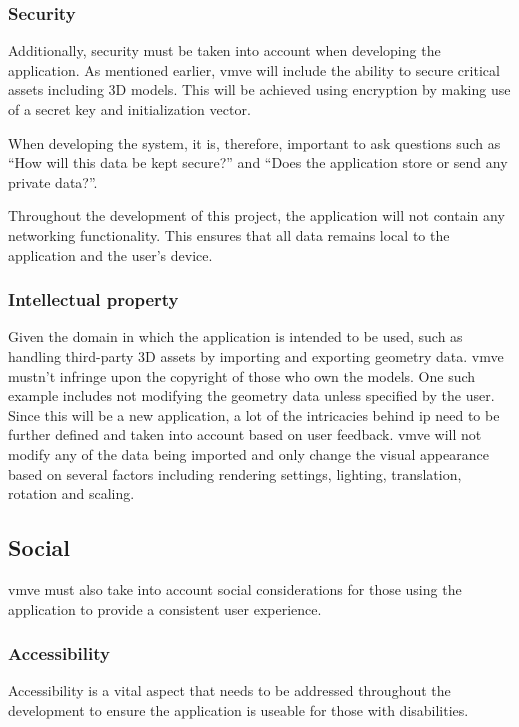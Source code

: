 \documentclass[11pt]{article}
\begin{document}
\subsubsection{Security}
Additionally, security must be taken into account when developing the
application. As mentioned earlier, \gls{vmve} will include the ability to secure
critical assets including 3D models. This will be achieved using encryption by
making use of a secret key and initialization vector.

When developing the system, it is, therefore, important to ask questions such as
``How will this data be kept secure?'' and ``Does the application store or send
any private data?''. 

Throughout the development of this project, the application will not contain any
networking functionality. This ensures that all data remains local to the
application and the user's device.

\subsubsection{Intellectual property}
Given the domain in which the application is intended to be used, such as
handling third-party 3D assets by importing and exporting geometry data.
\gls{vmve} mustn't infringe upon the copyright of those who own the models. One
such example includes not modifying the geometry data unless specified by the
user. Since this will be a new application, a lot of the intricacies behind
\gls{ip} need to be further defined and taken into account based on user
feedback. \gls{vmve} will not modify any of the data being imported and only
change the visual appearance based on several factors including rendering
settings, lighting, translation, rotation and scaling. 

\subsection{Social}
\gls{vmve} must also take into account social considerations for those using the
application to provide a consistent user experience.

\subsubsection{Accessibility}
Accessibility is a vital aspect that needs to be addressed throughout the
development to ensure the application is useable for those with disabilities.
\end{document}
